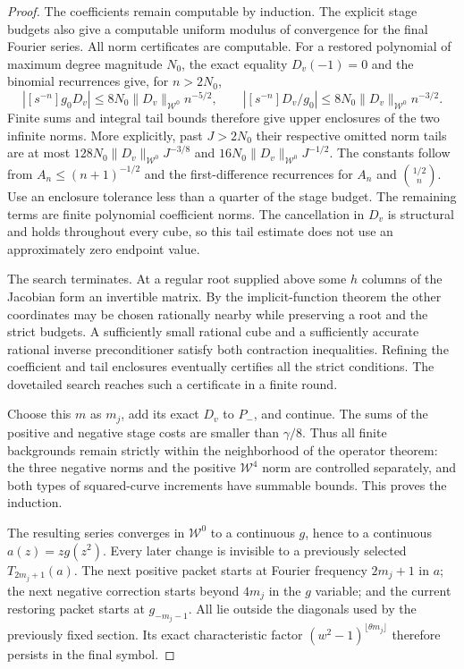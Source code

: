 \documentclass[11pt]{article}
\begin{document}
\begin{proof}
The coefficients remain computable by induction. The explicit stage
budgets also give a computable uniform modulus of convergence for
the final Fourier series. All norm certificates are computable. For a restored polynomial
of maximum degree magnitude $N_0$, the exact equality $D_v(-1)=0$
and the binomial recurrences give, for $n>2N_0$,
\[
 |[s^{-n}]g_0D_v|\le 8N_0\|D_v\|_{\mathcal W^0}n^{-5/2},
 \qquad
 |[s^{-n}]D_v/g_0|\le 8N_0\|D_v\|_{\mathcal W^0}n^{-3/2}.
\]
Finite sums and integral tail bounds therefore give upper
enclosures of the two infinite norms. More explicitly, past
$J>2N_0$ their respective omitted norm tails are at most
$128N_0\|D_v\|_{\mathcal W^0}J^{-3/8}$ and
$16N_0\|D_v\|_{\mathcal W^0}J^{-1/2}$.
The constants follow from $A_n\le(n+1)^{-1/2}$ and the
first-difference recurrences for $A_n$ and $\binom{1/2}{n}$.
Use an enclosure tolerance
less than a quarter of the stage budget. The remaining terms
are finite polynomial coefficient norms. The cancellation in
$D_v$ is structural and holds throughout every cube, so this
tail estimate does not use an approximately zero endpoint value.

The search terminates. At a regular root supplied above some
$h$ columns of the Jacobian form an invertible matrix. By the
implicit-function theorem the other coordinates may be chosen
rationally nearby while preserving a root and the strict budgets.
A sufficiently small rational cube and a sufficiently accurate
rational inverse preconditioner satisfy both contraction
inequalities. Refining the coefficient and tail enclosures
eventually certifies all the strict conditions. The dovetailed
search reaches such a certificate in a finite round.

Choose this $m$ as $m_j$, add its exact $D_v$ to $P_-$, and
continue. The sums of the positive and negative stage costs are
smaller than $\gamma/8$. Thus all finite backgrounds remain
strictly within the neighborhood of the operator theorem:
the three negative norms and the positive $\mathcal W^4$ norm
are controlled separately, and both types of squared-curve
increments have summable bounds. This proves the induction.

The resulting series converges in $\mathcal W^0$ to a continuous
$g$, hence to a continuous $a(z)=zg(z^2)$.
Every later change is invisible to a previously selected
$T_{2m_j+1}(a)$. The next positive packet starts at Fourier
frequency $2m_j+1$ in $a$; the next negative correction starts
beyond $4m_j$ in the $g$ variable; and the current restoring
packet starts at $g_{-m_j-1}$. All lie outside the diagonals
used by the previously fixed section. Its exact characteristic
factor $(w^2-1)^{\lfloor\theta m_j\rfloor}$ therefore persists
in the final symbol.


\end{proof}
\end{document}
